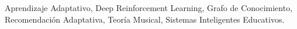 \begin{abstract}
\end{abstract}

\begin{IEEEkeywords}
Aprendizaje Adaptativo, Deep Reinforcement Learning, Grafo de Conocimiento, Recomendación Adaptativa, Teoría Musical, Sistemas Inteligentes Educativos.
\end{IEEEkeywords}